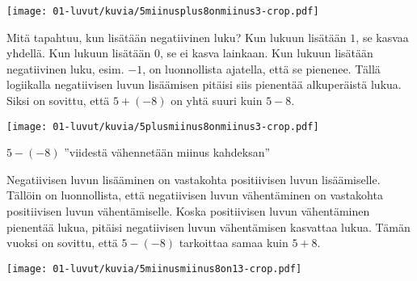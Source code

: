 \vspace{0.3cm}     
    
    \begin{center}
    \texttt{[image: 01-luvut/kuvia/5miinusplus8onmiinus3-crop.pdf]}
    \end{center}


    
    Mitä tapahtuu, kun lisätään negatiivinen luku? Kun lukuun lisätään $1$, se kasvaa yhdellä. Kun lukuun lisätään $0$, se ei kasva lainkaan. Kun lukuun lisätään negatiivinen luku, esim. $-1$, on luonnollista ajatella, että se pienenee. Tällä logiikalla negatiivisen luvun lisäämisen pitäisi siis pienentää alkuperäistä lukua. Siksi on sovittu, että $5+(-8)$ on yhtä suuri kuin $5-8$.
    
\vspace{0.3cm}     

    \begin{center}
    \texttt{[image: 01-luvut/kuvia/5plusmiinus8onmiinus3-crop.pdf]}
    \end{center}
    
    $5-(-8)$ ''viidestä vähennetään miinus kahdeksan''
    
    Negatiivisen luvun lisääminen on vastakohta positiivisen luvun lisäämiselle. Tällöin on luonnollista, että negatiivisen luvun vähentäminen on vastakohta positiivisen luvun vähentämiselle. Koska positiivisen luvun vähentäminen pienentää lukua, pitäisi negatiivisen luvun vähentämisen kasvattaa lukua. Tämän vuoksi on sovittu, että $5-(-8)$ tarkoittaa samaa kuin $5+8$.
    
\vspace{0.3cm}     
        
    \begin{center}
    \texttt{[image: 01-luvut/kuvia/5miinusmiinus8on13-crop.pdf]}
    \end{center}



